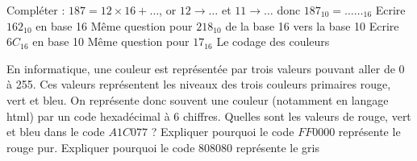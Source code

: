 \documentclass[11pt,a4paper]{article}
\begin{document}
\begin{Exercise}[title={Codage hexadécimal},number=2]
    \subQuestion Compléter :
    $ 187 = 12 \times 16 + \dots$, or $12 \rightarrow \dots$ et $11 \rightarrow  \dots$ donc $187_{10} = \dots \dots_{16}$
    \subQuestion Ecrire $162_{10}$ en base 16
    \subQuestion Même question pour $218_{10}$
    \Question de la base 16 vers la base 10
    \subQuestion Ecrire $6C_{16}$ en base 10
    \subQuestion Même question pour $17_{16}$
    \Question Le codage des couleurs \par
    En informatique, une couleur est représentée par trois valeurs pouvant aller de 0 à 255. Ces valeurs représentent les niveaux des trois couleurs primaires rouge, vert et bleu. On représente donc souvent une couleur (notamment en langage {\sc html}) par un code hexadécimal à 6 chiffres.
    \subQuestion Quelles sont les valeurs de rouge, vert et bleu dans le code $A1C077$ ?
    \subQuestion Expliquer pourquoi le code $FF0000$ représente le rouge pur.
    \subQuestion Expliquer pourquoi le code $808080$ représente le gris

\end{Exercise}
\end{document}

